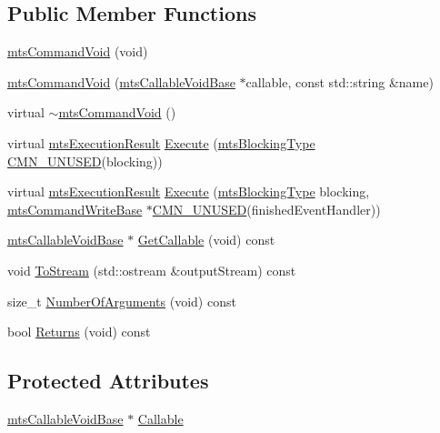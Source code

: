 \subsection*{Public Member Functions}
\begin{DoxyCompactItemize}
\item 
\hyperlink{classmts_command_void_add7891a491c181e37917f7a211d193c7}{mts\+Command\+Void} (void)
\item 
\hyperlink{classmts_command_void_a2f7b89cb275bf29655cc2ab534ccae99}{mts\+Command\+Void} (\hyperlink{classmts_callable_void_base}{mts\+Callable\+Void\+Base} $\ast$callable, const std\+::string \&name)
\item 
virtual \hyperlink{classmts_command_void_a99f6dff6f507e583a24764851e8c481a}{$\sim$mts\+Command\+Void} ()
\item 
virtual \hyperlink{classmts_execution_result}{mts\+Execution\+Result} \hyperlink{classmts_command_void_a931ef188b21159c6340021fdd7a2d373}{Execute} (\hyperlink{mts_forward_declarations_8h_ad7426ccb6c883bc780d0ee197dddcbe7}{mts\+Blocking\+Type} \hyperlink{cmn_portability_8h_a021894e2626935fa2305434b1e893ff6}{C\+M\+N\+\_\+\+U\+N\+U\+S\+E\+D}(blocking))
\item 
virtual \hyperlink{classmts_execution_result}{mts\+Execution\+Result} \hyperlink{classmts_command_void_a723eaff3810f72fe6490f36ed403e04c}{Execute} (\hyperlink{mts_forward_declarations_8h_ad7426ccb6c883bc780d0ee197dddcbe7}{mts\+Blocking\+Type} blocking, \hyperlink{classmts_command_write_base}{mts\+Command\+Write\+Base} $\ast$\hyperlink{cmn_portability_8h_a021894e2626935fa2305434b1e893ff6}{C\+M\+N\+\_\+\+U\+N\+U\+S\+E\+D}(finished\+Event\+Handler))
\item 
\hyperlink{classmts_callable_void_base}{mts\+Callable\+Void\+Base} $\ast$ \hyperlink{classmts_command_void_ad6297c6f39e9fa1fa4599bf24585d562}{Get\+Callable} (void) const 
\item 
void \hyperlink{classmts_command_void_a3b78ce1750d144b2e914be8e03274539}{To\+Stream} (std\+::ostream \&output\+Stream) const 
\item 
size\+\_\+t \hyperlink{classmts_command_void_a23ee972966793e40665977cf8f41c6be}{Number\+Of\+Arguments} (void) const 
\item 
bool \hyperlink{classmts_command_void_aeb8434a7a2da25fc331ae4bbff3ca859}{Returns} (void) const 
\end{DoxyCompactItemize}
\subsection*{Protected Attributes}
\begin{DoxyCompactItemize}
\item 
\hyperlink{classmts_callable_void_base}{mts\+Callable\+Void\+Base} $\ast$ \hyperlink{classmts_command_void_aece6de22d32c402ea6f4baf428d56a05}{Callable}
\end{DoxyCompactItemize}


